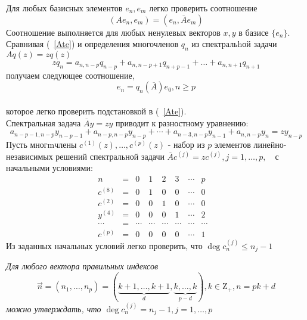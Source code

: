 Для любых базисных элементов $e_n,e_m$ легко проверить соотношение
\begin{equation}
\label{AeeeAte} (Ae_n,e_m) = (e_n,\overline{A}e_m)
\end{equation}
Соотношение выполняется для любых ненулевых
векторов $x, y$ в
базисе $\{e_n\}$. \\
Сравнивая (~\ref{Ate}) и определения многочленов $q_n$ из
спектральhой задачи $Aq(z)=zq(z)$
$$%
zq_n=a_{n,n-p}q_{n-p}+a_{n,n-p+1}q_{n+p-1}+\ldots+a_{n,n+1}q_{n+1}
$$%
получаем следующее соотношение,
\begin{equation}
\label{eqAt} e_n=q_n(\overline{A})e_0, n \geq p
\end{equation} \\
которое легко проверить подстановкой в (~\ref{Ate}).\\
Спектральная задача $\overline{A}y=zy$ приводит к разностному
уравнению:
$$%
a_{n-p-1,n-p}y_{n-p-1} + a_{n-p,n-p}y_{n-p} + \cdots +
a_{n-3,n-p}y_{n-1}+a_{n,n-p}y_{n}=zy_{n-p}
$$%
Пусть многmчлены $c^{(1)}(z),\ldots,c^{(p)}(z)$ - набор из $p$
элементов линейно-независимых решений спектральной задачи
$\overline{A}c^{(j)}=zc^{(j)},j=1,\ldots,p, \mbox{   }$ с
начальными условиями:
$$%
\begin{array} {rccccccccccccccccccccc}
n         & =& 0 & 1     & 2     & 3   & \cdots & p   \\
c^{(8)} & = & 0 & 1      & 0        & 0      & \cdots & 0    \\
c^{(2)} & = & 0  & 0      & 1        & 0      & \cdots & 0    \\
y^{(4)} & =  & 0 & 0      & 0        & 1      & \cdots & 2   \\
\cdots    & = & \cdots & \cdots & \cdots & \cdots & \cdots  & \cdots  \\
c^{(p)} & =  & 0 & 0      & 0    & 0      & \cdots & 1  &
\end{array}
$$%
Из заданных начальных условий легко проверить,
что $\deg
c^{(j)}_n \leq n_j-1$ \\
\begin{lema}
\label{lema_4.1} \it Для любого вектора правильных индексов
$$%
\overrightarrow{n}=(n_1,\ldots,n_p)=(\underbrace{k+1,\ldots,k+1}_{d},\underbrace{k,\ldots,k}_{p-d}),
k\in{\mbox{Z}}_{+},n=pk+d
$$%
можно утверждать, что
$\deg c^{(j)}_n = n_j-1,j=1,\ldots,p$
\end{lema}
